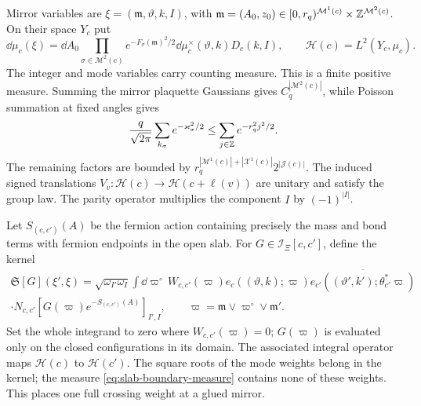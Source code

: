 Mirror variables are
$\xi=(\mathfrak m,\vartheta,k,I)$, with
$\mathfrak m=(A_0,z_0)\in[0,r_q)^{\mathcal M^1(c)}
\times\mathbb Z^{\mathcal M^2(c)}$. On their space $Y_c$ put
\begin{equation}\label{eq:slab-boundary-measure}
 \dd\mu_c(\xi)=\dd A_0
      \prod_{\sigma\in\mathcal M^2(c)}e^{-F_\sigma(\mathfrak m)^2/2}
                  \dd\mu_c^\times(\vartheta,k)D_c(k,I),
 \qquad \mathcal H(c)=L^2(Y_c,\mu_c).
\end{equation}
The integer and mode variables carry counting measure. This is a
finite positive measure. Summing the mirror plaquette Gaussians gives
$C_q^{|\mathcal M^2(c)|}$, while Poisson summation at fixed angles
gives
\[
 \frac q{\sqrt{2\pi}}\sum_{k_\sigma}e^{-\varkappa_\sigma^2/2}
 \le\sum_{j\in\mathbb Z}e^{-r_q^2j^2/2}.
\]
The remaining factors are bounded by
$r_q^{|\mathcal M^1(c)|+|\mathcal X^1(c)|}2^{|\mathcal J(c)|}$.
The induced signed translations $V_v:\mathcal H(c)\to
\mathcal H(c+\ell(v))$ are unitary and satisfy the group law. The
parity operator multiplies the component $I$ by $(-1)^{|I|}$.

Let $S_{(c,c')}(A)$ be the fermion action containing precisely the mass
and bond terms with fermion endpoints in the open slab. For
$G\in\mathcal I_\Xi[c,c']$, define the kernel
\begin{multline}\label{eq:slab-kernel}
 \mathfrak S[G](\xi',\xi)=\sqrt{\omega_{I'}\omega_I}
      \int\dd\varpi^\circ\,W_{c,c'}(\varpi)
      e_c((\vartheta,k);\varpi)
       \overline{e_{c'}((\vartheta',k');\theta_{c'}^*\varpi)}
       \\
       \cdot N_{c,c'}[G(\varpi)e^{-S_{(c,c')}(A)}]_{I',I},
       \qquad \varpi=\mathfrak m\vee\varpi^\circ\vee\mathfrak m'.
\end{multline}
Set the whole integrand to zero where $W_{c,c'}(\varpi)=0$;
$G(\varpi)$ is evaluated only on the closed configurations in its
domain.
The associated integral operator maps $\mathcal H(c)$ to
$\mathcal H(c')$. The square roots of the mode weights belong in the
kernel; the measure \eqref{eq:slab-boundary-measure} contains none of
these weights. This places one full crossing weight at a glued mirror.

